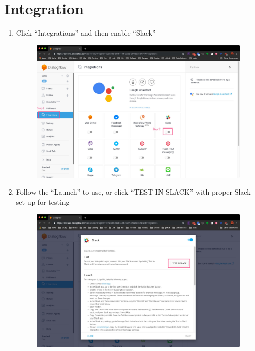 \section{Integration} %
\label{sec:integration}
	\begin{enumerate}
		\item Click “Integrations” and then enable “Slack”

		\begin{figure}[H]
			\centering
			\includegraphics[width=\linewidth, frame]{img/manual_16.jpg}
		\end{figure}

		\item Follow the “Launch” to use, or click “TEST IN SLACK” with proper Slack set-up for testing

		\begin{figure}[H]
			\centering
			\includegraphics[width=\linewidth, frame]{img/manual_17.jpg}
		\end{figure}
	\end{enumerate}

